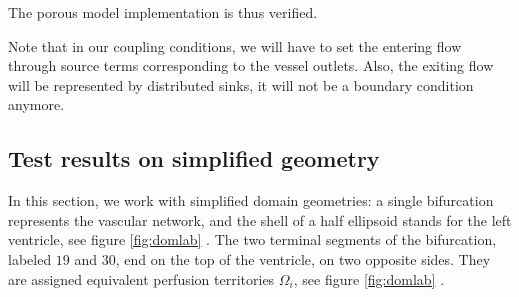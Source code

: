 \documentclass[a4paper, 11pt]{article} %
\begin{document}
The porous model implementation is thus verified. 

Note that in our coupling conditions, we will have to set the entering flow through source terms corresponding to the vessel outlets. Also, the exiting flow will be represented by distributed sinks, it will not be a boundary condition anymore.

\subsection{Test results on simplified geometry}
In this section, we work with simplified domain geometries: a single bifurcation represents the vascular network, and the shell of a half ellipsoid stands for the left ventricle, see figure \ref{fig:domlab} \protect{}. The two terminal segments of the bifurcation, labeled $19$ and $30$, end on the top of the ventricle, on two opposite sides. They are assigned equivalent perfusion territories $\Omega_i$, see figure \ref{fig:domlab} \protect{}.\\ 
\end{document}
